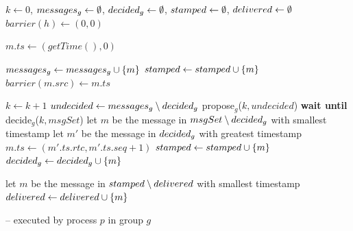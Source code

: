 \documentclass[times, 10pt]{article}
\begin{document}
\begin{algorithm}
\begin{distribalgo}[1]

\blankline
{}
  \STATE $k \leftarrow 0$, $messages\text{$_g$} \leftarrow \emptyset$, $decided\text{$_g$} \leftarrow \emptyset$, $stamped \leftarrow \emptyset$, $delivered \leftarrow \emptyset$
    \STATE $barrier(h) \leftarrow (0,0)$ 
  \ENDINDENT
\ENDINDENT 

\blankline
{}
  \STATE $m.ts \leftarrow (getTime(),0)$ \label{algline:gettime}
  \STATE {} \label{algline:rmlocal}
\ENDINDENT

\blankline
{}
    \STATE $messages\text{$_g$} \leftarrow messages\text{$_g$} \cup \{m\}$ \label{algline:addtogroupmsgs}
   \label{algline:notbptwice}
    \STATE $stamped \leftarrow stamped \cup \{m\}$ \label{algline:insbp1}
    \STATE $barrier(m.src) \leftarrow m.ts$ \label{algline:incbar}
  \ENDIF
\ENDWHEN

\blankline
\WHEN{$\localmsgs \setminus \decided \neq \emptyset$}
  \STATE $k \leftarrow k + 1$
	\STATE $undecided \leftarrow messages\text{$_g$} \setminus decided\text{$_g$}$ \label{algline:undecided}
	\STATE propose$_g$($k, undecided$) \label{algline:propose}
	\STATE \textbf{wait until} decide$_g$($k, msgSet$) \label{algline:decide}
		\STATE let $m$ be the message in $msgSet \setminus decided\text{$_g$}$ with smallest timestamp \label{algline:decidedloopbegin}
		\STATE let $m'$ be the message in $decided\text{$_g$}$ with greatest timestamp
			\STATE $m.ts \leftarrow (m'.ts.rtc, m'.ts.seq + 1)$ \label{algline:changetsafterdecision}
		\ENDIF     
		 \label{algline:checkcons}
			\STATE $stamped \leftarrow stamped \cup \{m\}$  \label{algline:insbp2}
		\ENDIF
		\STATE $decided\text{$_g$} \leftarrow decided\text{$_g$} \cup \{m\}$  \label{algline:addtodecided}
		\STATE {} \label{algline:rmothers}
	\ENDWHILE

\ENDWHEN

\blankline
\WHEN{$\stamped \setminus \delivered \neq \emptyset$} \label{algline:inammulticast}
	\STATE let $m$ be the message in $stamped \setminus delivered$ with smallest timestamp \label{algline:condel1}
	 \label{algline:condel2}
		  \STATE {} \label{algline:consdeliver}
		\STATE $delivered \leftarrow delivered \cup \{m\}$ \label{algline:addtodelivered}
	\ENDIF
\ENDWHEN
\blankline

\caption{ -- executed by process $p$ in group $g$}
\label{algorithm:deliveryminimal}
\end{distribalgo}
\end{algorithm}
\end{document}
